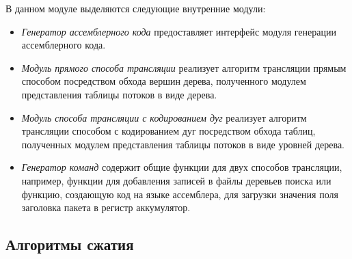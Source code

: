 \documentclass[oneside,final,12pt]{extarticle}
\begin{document}
            В данном модуле выделяются следующие внутренние модули:
            \begin{itemize}
                \item \textit{Генератор ассемблерного кода} предоставляет интерфейс модуля 
                    генерации ассемблерного кода.
                \item \textit{Модуль прямого способа трансляции} реализует алгоритм трансляции 
                    прямым способом посредством обхода вершин дерева, 
                    полученного модулем представления таблицы потоков в виде дерева.
                \item \textit{Модуль способа трансляции с кодированием дуг} реализует алгоритм 
                    трансляции способом с кодированием дуг посредством обхода таблиц, полученных 
                    модулем представления таблицы потоков в виде уровней дерева.
                \item \textit{Генератор команд} содержит общие функции для двух способов трансляции,
                    например, функции для добавления записей в файлы деревьев поиска или функцию, 
                    создающую код на языке ассемблера, для загрузки значения поля заголовка 
                    пакета в регистр аккумулятор.
            \end{itemize}

        \subsection{Алгоритмы сжатия}
\end{document}

